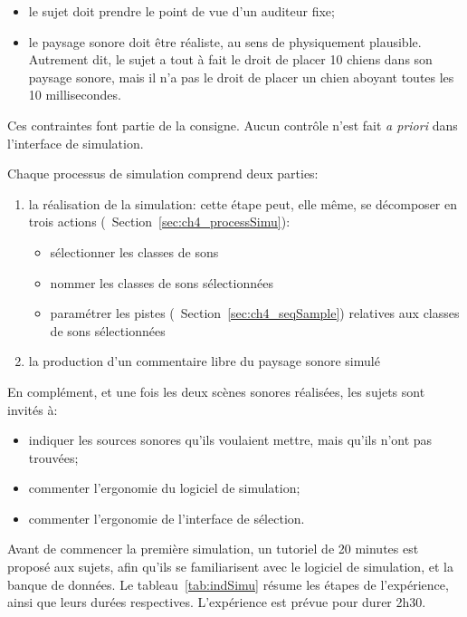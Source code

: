 \begin{itemize}
\item le sujet doit prendre le point de vue d’un auditeur fixe;

\item le paysage sonore doit être réaliste, au sens de physiquement plausible. Autrement dit, le sujet a tout à fait le droit de placer 10 chiens dans son paysage sonore, mais il n’a pas le droit de placer un chien aboyant toutes les 10 millisecondes.

\end{itemize}

Ces contraintes font partie de la consigne. Aucun contrôle n'est fait \emph{a priori} dans l'interface de simulation.

Chaque processus de simulation comprend deux parties:

\begin{enumerate}
\item la réalisation de la simulation: cette étape peut, elle même, se décomposer en trois actions (\cf~Section~\ref{sec:ch4_processSimu}):
\begin{itemize}
\item sélectionner les classes de sons
\item nommer les classes de sons sélectionnées
\item paramétrer les pistes (\cf~Section~\ref{sec:ch4_seqSample}) relatives aux classes de sons sélectionnées
\end{itemize}
\item la production d'un commentaire libre du paysage sonore simulé
\end{enumerate}

En complément, et une fois les deux scènes sonores réalisées, les sujets sont invités à:

\begin{itemize}
\item indiquer les sources sonores qu'ils voulaient mettre, mais qu'ils n'ont pas trouvées;
\item commenter l’ergonomie du logiciel de simulation;
\item commenter l’ergonomie de l'interface de sélection.
\end{itemize}

Avant de commencer la première simulation, un tutoriel de 20 minutes est proposé aux sujets, afin qu'ils se familiarisent avec le logiciel de simulation, et la banque de données. Le tableau~\ref{tab:indSimu} résume les étapes de l’expérience, ainsi que leurs durées respectives. L'expérience est prévue pour durer 2h30. \\

